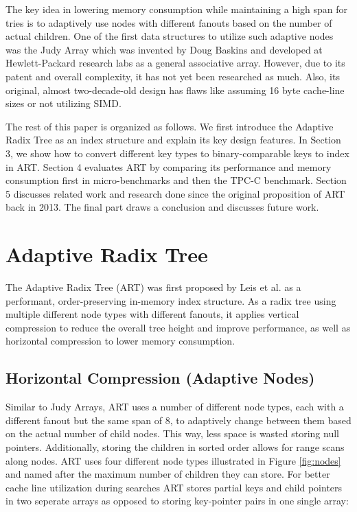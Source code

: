 \documentclass[acmtog, nonacm]{acmart}
\begin{document}
The key idea in lowering memory consumption while maintaining a high span for tries is to adaptively use nodes 
with different fanouts based on the number of actual children. One of the first data structures to utilize such 
adaptive nodes was the Judy Array \cite{baskins2004judy} which was invented by Doug Baskins and developed at 
Hewlett-Packard research labs as a general associative array. However, due to its patent and overall complexity, 
it has not yet been researched as much. Also, its original, almost two-decade-old design has flaws like assuming 
16 byte cache-line sizes or not utilizing SIMD.

The rest of this paper is organized as follows. We first introduce the Adaptive Radix Tree as an index structure 
and explain its key design features. In Section 3, we show how to convert different key types to binary-comparable keys to 
index in ART. Section 4 evaluates ART by comparing its performance and memory consumption first in 
micro-benchmarks and then the TPC-C benchmark. Section 5 discusses related work and research done since the 
original proposition of ART back in 2013. The final part draws a conclusion and discusses future work.

\section{Adaptive Radix Tree}
The Adaptive Radix Tree (ART) was first proposed by Leis et al. \cite{6544812} as a performant, order-preserving 
in-memory index structure. As a radix tree using multiple different node types with different fanouts, it applies 
vertical compression to reduce the overall tree height and improve performance, as well as horizontal compression 
to lower memory consumption.

\subsection{Horizontal Compression (Adaptive Nodes)}
Similar to Judy Arrays, ART uses a number of different node types, each with a different fanout but the same span 
of 8, to adaptively change between them based on the actual number of child nodes. This way, less space is wasted 
storing null pointers. Additionally, storing the children in sorted order allows for range scans along nodes. ART 
uses four different node types illustrated in Figure \ref{fig:nodes} and named after the maximum number of children 
they can store. For better cache line utilization during searches ART stores partial keys and child pointers in two 
seperate arrays as opposed to storing key-pointer pairs in one single array:
\end{document}
